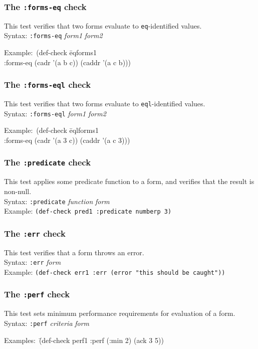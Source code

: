 \documentclass{article}
\begin{document}
\subsubsection{The \texttt{:forms-eq} check} 
This test verifies that two forms evaluate to \texttt{eq}-identified
values.
\\ Syntax: \texttt{:forms-eq} \textit{form1} \textit{form2}
{\ttfamily\begin{tabbing}
\textrm{Example:}\ (def-check \=eqforms1
\\ \>  :forms-eq (cadr '(a b c)) (caddr '(a c b)))
\end{tabbing}}

\subsubsection{The \texttt{:forms-eql} check} 
This test verifies that two forms evaluate to \texttt{eql}-identified
values.
\\ Syntax: \texttt{:forms-eql} \textit{form1} \textit{form2}
{\ttfamily\begin{tabbing}
\textrm{Example:}\ (def-check \=eqlforms1
\\ \>  :forms-eq (cadr '(a 3 c)) (caddr '(a c 3)))
\end{tabbing}}

\subsubsection{The \texttt{:predicate} check} 
This test applies some predicate function to a form, and verifies that
the result is non-null.
\\ Syntax: \texttt{:predicate} \textit{function} \textit{form}
\\ Example: \texttt{(def-check pred1 :predicate numberp 3)}

\subsubsection{The \texttt{:err} check} 
This test verifies that a form throws an
error.
\\ Syntax: \texttt{:err} \textit{form}
\\ Example: \texttt{(def-check err1 :err (error "this should be caught"))}

\subsubsection{The \texttt{:perf} check} 
This test sets minimum performance requirements for evaluation of a
form.
\\ Syntax: \texttt{:perf} \textit{criteria} \textit{form}
{\ttfamily\begin{tabbing}
\textrm{Examples:}\ \=(def-check perf1 :perf (:min 2) (ack 3 5))
\end{tabbing}}
\end{document}
